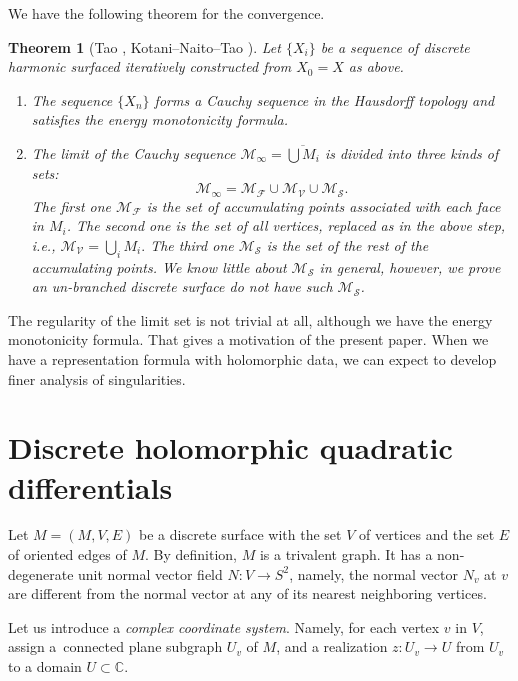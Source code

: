\documentclass[10pt,a4paper]{amsart}
\newcommand{\C}{\mathbb{C}}
\newcommand{\MV}{{\mathcal V}}
\newcommand{\MF}{{\mathcal F}}
\newcommand{\MM}{{\mathcal M}}
\newcommand{\MS}{{\mathcal S}}
\newcommand{\1}{{\bf 1}}
\numberwithin{equation}{section}
\newtheorem{Theorem}{Theorem}[section]
\begin{document}
We have the following theorem for the convergence.

\begin{Theorem}[Tao \cite{tao}, Kotani--Naito--Tao \cite{kotani-naito-tao}]
 Let $\{X_{i} \}$ be a sequence of discrete harmonic surfaced iteratively constructed from $X_{0} = X$ as above.
 \begin{enumerate}\itemsep=0pt
 \item[$(1)$]
 The sequence $\{ X_n \}$ forms a Cauchy sequence in the Hausdorff topology
 and satisfies the energy monotonicity formula. %
 \item[$(2)$]
 The limit of the Cauchy sequence
 $\mathcal {M}_{\infty} = \overline{\bigcup M_i}$
 is divided into three kinds of sets:
 \begin{equation*}
 \mathcal {M}_{\infty} = \MM_{\MF} \cup \MM_{\MV} \cup \MM_{\MS}.
 \end{equation*}
 The first one $\MM_{\MF}$ is the set of accumulating points associated with each face in $M_i$.
 The second one is the set of all vertices, replaced as in the above step,
 i.e., \begin{math}
 \mathcal{M}_{\MV} = \bigcup_{i} M_i.
 \end{math}
 The third one $\MM_{\MS}$ is the set of the rest of the accumulating points.
 We know little about $\MM_{\MS}$ in general,
 however, we prove an un-branched discrete surface do not have such $\MM_{\MS}$.
 \end{enumerate}
\end{Theorem}
The regularity of the limit set is not trivial at all,
although we have the energy monotonicity formula.
That gives a motivation of the present paper.
When we have a representation formula with holomorphic data, we can expect to develop finer analysis of singularities.
\section{Discrete holomorphic quadratic differentials}
Let $M=(M, V, E)$ be a discrete surface with the set $V$ of vertices and the set $E$ of oriented edges of $M$.
By definition, $M$ is a trivalent graph. It has a non-degenerate unit normal vector field $N\colon V \to S^2$,
namely, the normal vector $N_v$ at $v$ are different from the normal vector at any of its nearest neighboring vertices.

Let us introduce a {\it complex coordinate system}.
Namely, for each vertex $v$ in $V$, assign a~connected plane subgraph $U_v$ of $M$,
and a realization $z\colon U_v \to U$ from $U_v$ to a domain $U \subset \C$.
\end{document}
